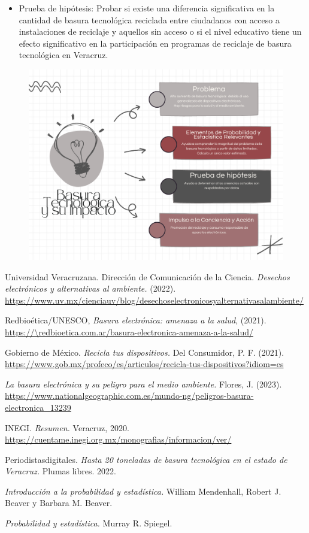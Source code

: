 \documentclass[letterpaper,12pt]{article}
\begin{document}
\begin{sloppypar}
\begin{itemize}
    \item Prueba de hipótesis: Probar si existe una diferencia significativa en la cantidad de basura tecnológica reciclada entre ciudadanos con acceso a instalaciones de reciclaje y aquellos sin acceso o si el nivel educativo tiene un efecto significativo en la participación en programas de reciclaje de basura tecnológica en Veracruz.
\end{itemize}
\begin{figure}[H]
    \centering 
    \includegraphics[width = 0.8 \linewidth]{mapa.png}
\end{figure}

\end{sloppypar}

\newpage

\begin{thebibliography}{9}  
Universidad Veracruzana. Dirección de Comunicación de la Ciencia. 
\emph{Desechos electrónicos y alternativas al ambiente.} (2022).
\url{https://www.uv.mx/cienciauv/blog/desechoselectronicosyalternativasalambiente/} 

Redbioética/UNESCO, \emph{Basura electrónica: amenaza a la salud}, (2021). 
\url{https://\redbioetica.com.ar/basura-electronica-amenaza-a-la-salud/}

Gobierno de México. \emph{Recicla tus dispositivos.} Del Consumidor, P. F. (2021). 
\url{https://www.gob.mx/profeco/es/articulos/recicla-tus-dispositivos?idiom=es}

\emph{La basura electrónica y su peligro para el medio ambiente. } Flores, J. (2023).
\url{https://www.nationalgeographic.com.es/mundo-ng/peligros-basura-electronica_13239}

INEGI. \emph{Resumen.} Veracruz, 2020.
\url{https://cuentame.inegi.org.mx/monografias/informacion/ver/}

Periodistasdigitales. \emph{Hasta 20 toneladas de basura tecnológica en el estado de Veracruz.} Plumas libres. 2022.

\emph{Introducción a la probabilidad y estadística.} William Mendenhall, Robert J. Beaver y Barbara M. Beaver.

\emph{Probabilidad y estadística.} Murray R. Spiegel.


\end{thebibliography}
\end{document}

